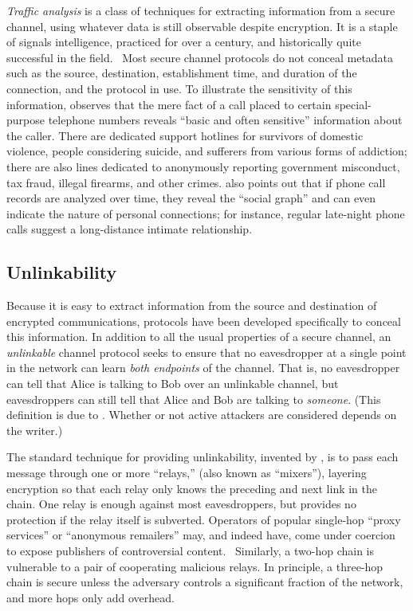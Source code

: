 \documentclass[tinymargin]{zarticle}
\begin{document}
\emph{Traffic analysis} is a class of techniques for extracting
information from a secure channel, using whatever data is still
observable despite encryption.  It is a staple of signals
intelligence, practiced for over a century, and historically quite
successful in the field.~\cite{kahn1967codebreakers} Most secure
channel protocols do not conceal metadata such as the source,
destination, establishment time, and duration of the connection, and
the protocol in use.  To illustrate the sensitivity of this
information, \textcite{felten2013decl} observes that the mere fact of
a call placed to certain special-purpose telephone numbers reveals
“basic and often sensitive” information about the caller.  There are
dedicated support hotlines for survivors of domestic violence, people
considering suicide, and sufferers from various forms of addiction;
there are also lines dedicated to anonymously reporting government
misconduct, tax fraud, illegal firearms, and other crimes.
\citeauthor{felten2013decl} also points out that if phone call records
are analyzed over time, they reveal the “social graph” and can even
indicate the nature of personal connections; for instance, regular
late-night phone calls suggest a long-distance intimate relationship.

\subsection{Unlinkability}

Because it is easy to extract information from the source and
destination of encrypted communications, protocols have been developed
specifically to conceal this information.  In addition to all the usual
properties of a secure channel, an \emph{unlinkable} channel protocol
seeks to ensure that no eavesdropper at a single point in the network
can learn \emph{both endpoints} of the channel.  That is, no
eavesdropper can tell that Alice is talking to Bob over an unlinkable
channel, but eavesdroppers can still tell that Alice and Bob are
talking to \emph{someone}.  (This definition is due to
\textcite{pfitzmann2010terminology}.  Whether or not active attackers
are considered depends on the writer.)

The standard technique for providing unlinkability, invented by
\textcite{chaum1981mix}, is to pass each message through one or more
“relays,” (also known as “mixers”), layering encryption so that each
relay only knows the preceding and next link in the chain. One relay
is enough against most eavesdroppers, but provides no protection if
the relay itself is subverted.  Operators of popular single-hop “proxy
services” or “anonymous remailers” may, and indeed have, come under
coercion to expose publishers of controversial
content.~\cite{newman1996church, singel2007hushmail,
  ackerman2013lavabit} Similarly, a two-hop chain is vulnerable to a
pair of cooperating malicious relays.  In principle, a three-hop chain
is secure unless the adversary controls a significant fraction of the
network, and more hops only add overhead.~\cite{wright2002analysis,
  wright2003defending}
\end{document}
